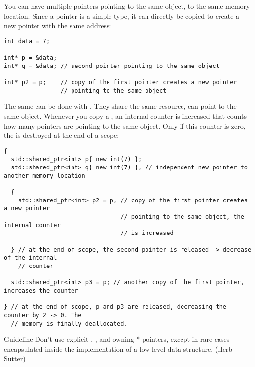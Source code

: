 You can have multiple pointers pointing to the same object, \ie to the same memory location. Since a pointer is a simple type, it can directly be copied
to create a new pointer with the same address:
%
\begin{verbatim}
int data = 7;

int* p = &data;
int* q = &data; // second pointer pointing to the same object

int* p2 = p;    // copy of the first pointer creates a new pointer
                // pointing to the same object
\end{verbatim}
%
The same can be done with . They share the same resource, \ie can point to the same object. Whenever you copy a , an internal
counter is increased that counts how many pointers are pointing to the same object. Only if this counter is zero, the  is destroyed at the
end of a scope:
\begin{verbatim}
{
  std::shared_ptr<int> p{ new int(7) };
  std::shared_ptr<int> q{ new int(7) }; // independent new pointer to another memory location

  {
    std::shared_ptr<int> p2 = p; // copy of the first pointer creates a new pointer
                                 // pointing to the same object, the internal counter
                                 // is increased

  } // at the end of scope, the second pointer is released -> decrease of the internal
    // counter

  std::shared_ptr<int> p3 = p; // another copy of the first pointer, increases the counter

} // at the end of scope, p and p3 are released, decreasing the counter by 2 -> 0. The
  // memory is finally deallocated.
\end{verbatim}

\begin{guideline}{Guideline}
  Don’t use explicit , , and owning * pointers, except in rare cases encapsulated inside the implementation of a
  low-level data structure. (Herb Sutter)
\end{guideline}
